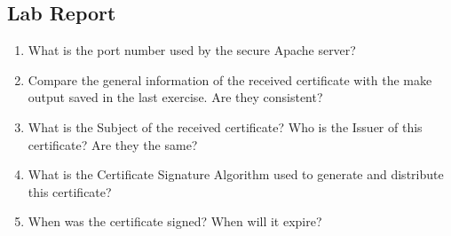 \documentclass[10pt,a4paper]{article}
\numberwithin{equation}{section}
\numberwithin{figure}{section}
\numberwithin{table}{section}
\begin{document}
	\subsection*{Lab Report}
	\begin{enumerate}
		\setlength{\itemindent}{0pt}
		\item What is the port number used by the secure Apache server?
		\item Compare the general information of the received certificate with the make output saved in the last exercise. Are they consistent?
		\item What is the Subject of the received certificate? Who is the Issuer of this certificate? Are they the same?
		\item What is the Certificate Signature Algorithm used to generate and distribute this certificate?
		\item When was the certificate signed? When will it expire?
	\end{enumerate}
	
\end{document}
